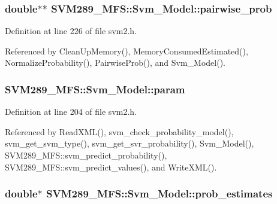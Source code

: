 \subsubsection[{\texorpdfstring{pairwise\+\_\+prob}{pairwise_prob}}]{\setlength{\rightskip}{0pt plus 5cm}double$\ast$$\ast$ S\+V\+M289\+\_\+\+M\+F\+S\+::\+Svm\+\_\+\+Model\+::pairwise\+\_\+prob}\hypertarget{struct_s_v_m289___m_f_s_1_1_svm___model_a56bfa09257711ad80e18c3813a515fed}{}\label{struct_s_v_m289___m_f_s_1_1_svm___model_a56bfa09257711ad80e18c3813a515fed}


Definition at line 226 of file svm2.\+h.



Referenced by Clean\+Up\+Memory(), Memory\+Consumed\+Estimated(), Normalize\+Probability(), Pairwise\+Prob(), and Svm\+\_\+\+Model().

\subsubsection[{\texorpdfstring{param}{param}}]{ S\+V\+M289\+\_\+\+M\+F\+S\+::\+Svm\+\_\+\+Model\+::param}\hypertarget{struct_s_v_m289___m_f_s_1_1_svm___model_af44a309facec24212604b219dc411582}{}\label{struct_s_v_m289___m_f_s_1_1_svm___model_af44a309facec24212604b219dc411582}


Definition at line 204 of file svm2.\+h.



Referenced by Read\+X\+M\+L(), svm\+\_\+check\+\_\+probability\+\_\+model(), svm\+\_\+get\+\_\+svm\+\_\+type(), svm\+\_\+get\+\_\+svr\+\_\+probability(), Svm\+\_\+\+Model(), S\+V\+M289\+\_\+\+M\+F\+S\+::svm\+\_\+predict\+\_\+probability(), S\+V\+M289\+\_\+\+M\+F\+S\+::svm\+\_\+predict\+\_\+values(), and Write\+X\+M\+L().

\subsubsection[{\texorpdfstring{prob\+\_\+estimates}{prob_estimates}}]{\setlength{\rightskip}{0pt plus 5cm}double$\ast$ S\+V\+M289\+\_\+\+M\+F\+S\+::\+Svm\+\_\+\+Model\+::prob\+\_\+estimates}\hypertarget{struct_s_v_m289___m_f_s_1_1_svm___model_af9f2c576c765f5d622dd7bc55454883c}{}\label{struct_s_v_m289___m_f_s_1_1_svm___model_af9f2c576c765f5d622dd7bc55454883c}


